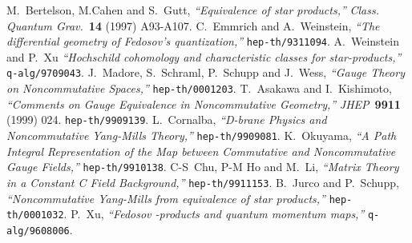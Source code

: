 \documentclass[10pt,a4paper]{article}
\begin{document}
\begin{thebibliography}{99}
M.~Bertelson, M.Cahen and S.~Gutt,
{\it ``Equivalence of star products,''}
{\sl Class. Quantum Grav.}~{\bf 14} (1997) A93-A107.
C.~Emmrich and A.~Weinstein,
{\it ``The differential geometry of Fedosov's quantization,''}
{\tt hep-th/9311094}.
A.~Weinstein and P.~Xu
{\it ``Hochschild cohomology and characteristic classes for star-products,''}
{\tt q-alg/9709043}.
J.~Madore, S.~Schraml, P.~Schupp and J.~Wess,
{\it ``Gauge Theory on Noncommutative Spaces,''}
{\tt hep-th/0001203}.
T.~Asakawa and I.~Kishimoto,
{\it ``Comments on Gauge Equivalence in Noncommutative Geometry,''}
{\sl JHEP}~{\bf 9911} (1999) 024. {\tt hep-th/9909139}.
L.~Cornalba,
{\it ``D-brane Physics and Noncommutative Yang-Mills Theory,''}
{\tt hep-th/9909081}.
K.~Okuyama,
{\it ``A Path Integral Representation of the Map between Commutative and Noncommutative Gauge Fields,''}
{\tt hep-th/9910138}.
C-S~Chu, P-M Ho and M.~Li,
{\it ``Matrix Theory in a Constant C Field Background,''}
{\tt hep-th/9911153}.
B.~Jurco and P.~Schupp,
{\it ``Noncommutative Yang-Mills from equivalence of star products,''}
{\tt hep-th/0001032}.
P.~Xu,
{\it ``Fedosov \myHighlight{$*$}\coordHE{}-products and quantum momentum maps,''}
{\tt q-alg/9608006}.
\end{thebibliography}
\end{document}
